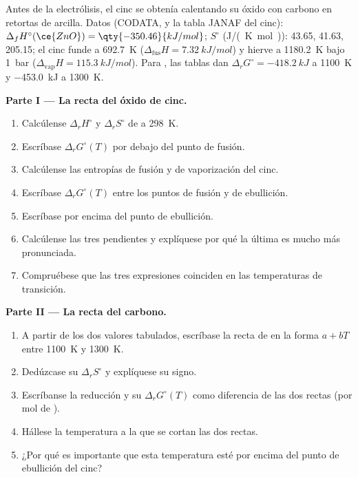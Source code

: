 \begin{problem}
\label{pb:b2:ellingham:1}
Antes de la electrólisis, el cinc se obtenía calentando su óxido con carbono en retortas
de arcilla. Datos (CODATA, y la tabla JANAF del cinc): $\Delta_f H^\circ(\ce{ZnO})
= \qty{-350.46}{kJ/mol}$; $S^\circ$ (\unit{J/(K.mol)}):  43.65, 
41.63,  205.15; el cinc funde a \qty{692.7}{K} ($\Delta_{\text{fus}}H =
\qty{7.32}{kJ/mol}$) y hierve a \qty{1180.2}{K} bajo \qty{1}{bar}
($\Delta_{\text{vap}}H = \qty{115.3}{kJ/mol}$). Para , las
tablas dan $\Delta_r G^\circ = \qty{-418.2}{kJ}$ a \qty{1100}{K} y
\qty{-453.0}{kJ} a \qty{1300}{K}.

\medskip
\noindent\textbf{Parte I --- La recta del óxido de cinc.}
\begin{enumerate}
  \item Calcúlense $\Delta_r H^\circ$ y $\Delta_r S^\circ$ de  a \qty{298}{K}.
  \item Escríbase $\Delta_r G^\circ(T)$ por debajo del punto de fusión.
  \item Calcúlense las entropías de fusión y de vaporización del cinc.
  \item Escríbase $\Delta_r G^\circ(T)$ entre los puntos de fusión y de ebullición.
  \item Escríbase por encima del punto de ebullición.
  \item Calcúlense las tres pendientes y explíquese por qué la última es mucho más pronunciada.
  \item Compruébese que las tres expresiones coinciden en las temperaturas de transición.
\end{enumerate}

\medskip
\noindent\textbf{Parte II --- La recta del carbono.}
\begin{enumerate}[resume]
  \item A partir de los dos valores tabulados, escríbase la recta de  en
        la forma $a + bT$ entre \qty{1100}{K} y \qty{1300}{K}.
  \item Dedúzcase su $\Delta_r S^\circ$ y explíquese su signo.
  \item Escríbanse la reducción  y su $\Delta_r
        G^\circ(T)$ como diferencia de las dos rectas (por mol de ).
  \item Hállese la temperatura a la que se cortan las dos rectas.
  \item ¿Por qué es importante que esta temperatura esté por encima del punto de ebullición
        del cinc?
\end{enumerate}


\end{problem}
